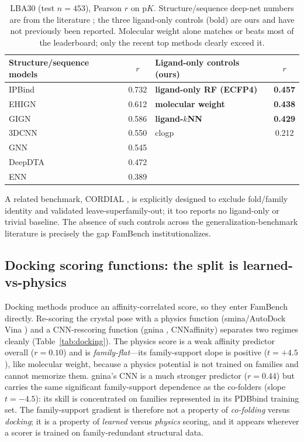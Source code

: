 \documentclass[11pt]{article}
\begin{document}
\begin{table}[t]
\centering\small
\caption{LBA30 (test $n{=}453$), Pearson $r$ on $\mathrm{p}K$. Structure/sequence deep-net numbers
are from the literature \citep{townshend2021atom3d,li2025ipbind}; the three ligand-only controls
(bold) are ours and have not previously been reported. Molecular weight alone matches or beats most
of the leaderboard; only the recent top methods clearly exceed it.}
\label{tab:lba30}
\begin{tabular}{lc@{\hskip 2em}lc}
\toprule
Structure/sequence models & $r$ & Ligand-only controls (ours) & $r$ \\
\midrule
IPBind      & 0.732 & \textbf{ligand-only RF (ECFP4)} & \textbf{0.457} \\
EHIGN       & 0.612 & \textbf{molecular weight}       & \textbf{0.438} \\
GIGN        & 0.586 & \textbf{ligand-$k$NN}           & \textbf{0.429} \\
3DCNN       & 0.550 & clogp                            & 0.212 \\
GNN         & 0.545 & & \\
DeepDTA     & 0.472 & & \\
ENN         & 0.389 & & \\
\bottomrule
\end{tabular}
\end{table}

A related benchmark, CORDIAL \citep{brown2025cordial}, is explicitly designed to exclude fold/family
identity and validated leave-superfamily-out; it too reports no ligand-only or trivial baseline. The
absence of such controls across the generalization-benchmark literature is precisely the gap
FamBench institutionalizes.

\subsection{Docking scoring functions: the split is learned-vs-physics}
\label{sec:docking}

Docking methods produce an affinity-correlated score, so they enter FamBench directly. Re-scoring
the crystal pose with a physics function (smina/AutoDock Vina \citep{trott2010vina}) and a
CNN-rescoring function (gnina \citep{mcnutt2021gnina}, CNNaffinity) separates two regimes cleanly
(Table~\ref{tab:docking}). The physics score is a weak affinity predictor overall ($r=0.10$) and is
\emph{family-flat}---its family-support slope is positive ($t=+4.5$), like molecular weight,
because a physics potential is not trained on families and cannot memorize them. gnina's CNN is a
much stronger predictor ($r=0.44$) but carries the same significant family-support dependence as the
co-folders (slope $t=-4.5$): its skill is concentrated on families represented in its PDBbind
training set. The family-support gradient is therefore not a property of \emph{co-folding} versus
\emph{docking}; it is a property of \emph{learned} versus \emph{physics} scoring, and it appears
wherever a scorer is trained on family-redundant structural data.
\end{document}

